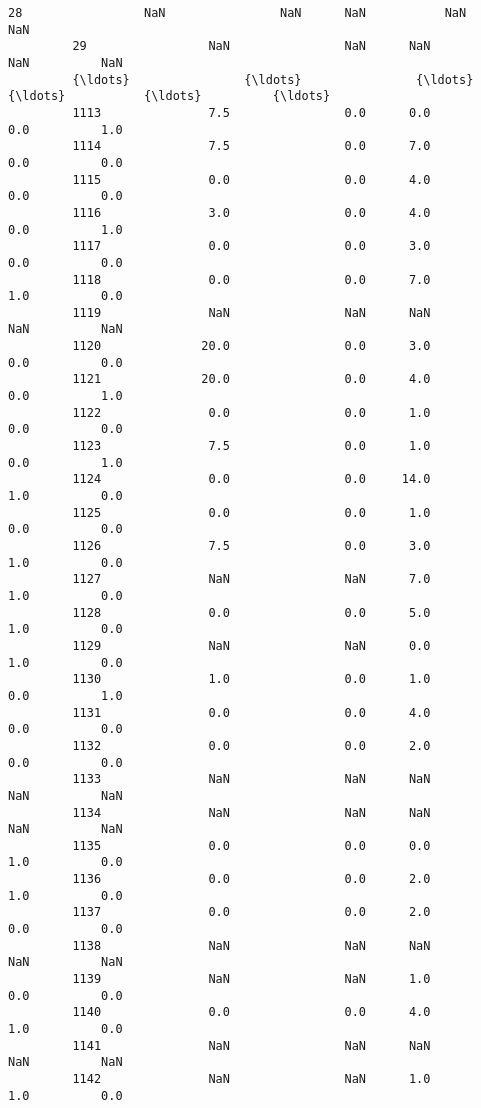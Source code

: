 \documentclass[11pt]{article}
\begin{document}
\begin{Verbatim}[commandchars=\\\{\}]
         28                 NaN                NaN      NaN           NaN          NaN   
         29                 NaN                NaN      NaN           NaN          NaN   
         {\ldots}                {\ldots}                {\ldots}      {\ldots}           {\ldots}          {\ldots}   
         1113               7.5                0.0      0.0           0.0          1.0   
         1114               7.5                0.0      7.0           0.0          0.0   
         1115               0.0                0.0      4.0           0.0          0.0   
         1116               3.0                0.0      4.0           0.0          1.0   
         1117               0.0                0.0      3.0           0.0          0.0   
         1118               0.0                0.0      7.0           1.0          0.0   
         1119               NaN                NaN      NaN           NaN          NaN   
         1120              20.0                0.0      3.0           0.0          0.0   
         1121              20.0                0.0      4.0           0.0          1.0   
         1122               0.0                0.0      1.0           0.0          0.0   
         1123               7.5                0.0      1.0           0.0          1.0   
         1124               0.0                0.0     14.0           1.0          0.0   
         1125               0.0                0.0      1.0           0.0          0.0   
         1126               7.5                0.0      3.0           1.0          0.0   
         1127               NaN                NaN      7.0           1.0          0.0   
         1128               0.0                0.0      5.0           1.0          0.0   
         1129               NaN                NaN      0.0           1.0          0.0   
         1130               1.0                0.0      1.0           0.0          1.0   
         1131               0.0                0.0      4.0           0.0          0.0   
         1132               0.0                0.0      2.0           0.0          0.0   
         1133               NaN                NaN      NaN           NaN          NaN   
         1134               NaN                NaN      NaN           NaN          NaN   
         1135               0.0                0.0      0.0           1.0          0.0   
         1136               0.0                0.0      2.0           1.0          0.0   
         1137               0.0                0.0      2.0           0.0          0.0   
         1138               NaN                NaN      NaN           NaN          NaN   
         1139               NaN                NaN      1.0           0.0          0.0   
         1140               0.0                0.0      4.0           1.0          0.0   
         1141               NaN                NaN      NaN           NaN          NaN   
         1142               NaN                NaN      1.0           1.0          0.0   
         

\end{Verbatim}
\end{document}
